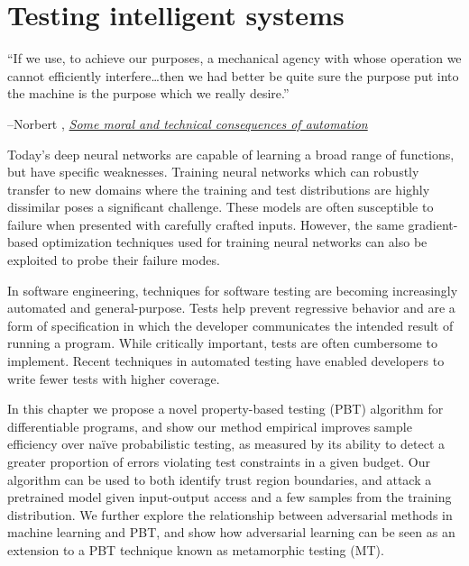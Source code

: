 \chapter{Testing intelligent systems}\label{ch:difftest}

\setlength{\epigraphwidth}{0.80\textwidth}
\epigraph{``If we use, to achieve our purposes, a mechanical agency with whose operation we cannot efficiently interfere\ldots then we had better be quite sure the purpose put into the machine is the purpose which we really desire.''}{\begin{flushright}--Norbert \citet{wiener1960some}, \href{https://www.ias.ac.in/article/fulltext/reso/004/01/0080-0088}{\textit{Some moral and technical consequences of automation}}~\end{flushright}}

Today's deep neural networks are capable of learning a broad range of functions, but have specific weaknesses. Training neural networks which can robustly transfer to new domains where the training and test distributions are highly dissimilar poses a significant challenge. These models are often susceptible to failure when presented with carefully crafted inputs. However, the same gradient-based optimization techniques used for training neural networks can also be exploited to probe their failure modes.

In software engineering, techniques for software testing are becoming increasingly automated and general-purpose. Tests help prevent regressive behavior and are a form of specification in which the developer communicates the intended result of running a program. While critically important, tests are often cumbersome to implement. Recent techniques in automated testing have enabled developers to write fewer tests with higher coverage.

In this chapter we propose a novel property-based testing (PBT) algorithm for differentiable programs, and show our method empirical improves sample efficiency over na\"ive probabilistic testing, as measured by its ability to detect a greater proportion of errors violating test constraints in a given budget. Our algorithm can be used to both identify trust region boundaries, and attack a pretrained model given input-output access and a few samples from the training distribution. We further explore the relationship between adversarial methods in machine learning and PBT, and show how adversarial learning can be seen as an extension to a PBT technique known as metamorphic testing (MT).

